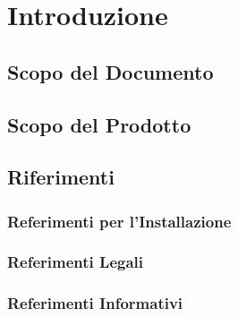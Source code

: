 \section{Introduzione}\label{Intro}

\subsection{Scopo del Documento}


\subsection{Scopo del Prodotto}


\subsection{Riferimenti}\label{Riferimenti}
\subsubsection{Referimenti per l'Installazione}

\subsubsection{Referimenti Legali}

\subsubsection{Referimenti Informativi}
